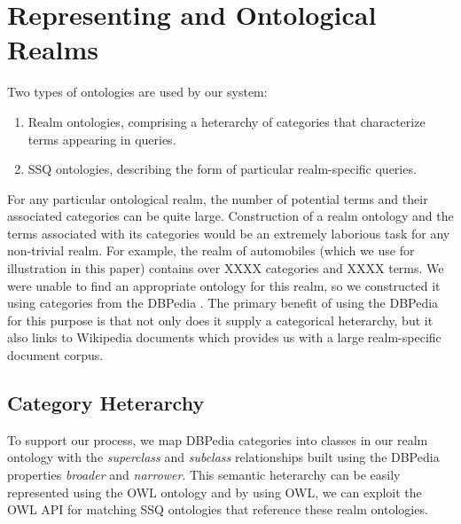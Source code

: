 \section{Representing and Ontological Realms}
Two types of ontologies are used by our system:
\begin{enumerate}
\item Realm ontologies, comprising a heterarchy of categories that
  characterize terms appearing in queries.
\item SSQ ontologies, describing the form of particular
  realm-specific queries.
\end{enumerate}
For any particular ontological realm, the number of potential
terms and their associated categories can be quite large.
Construction of a realm ontology and the terms associated
with its categories would be an extremely laborious task
for any non-trivial realm. For example, the realm of automobiles (which
we use for illustration in this paper) contains 
over XXXX categories and XXXX terms. We were unable to find
an appropriate ontology for this realm, so we constructed it
using categories from the DBPedia \cite{Auer07dbpedia:a}.
The primary benefit of using the DBPedia for this purpose is
that not only does it supply a categorical heterarchy, but it
also links to Wikipedia documents which provides us with a large
realm-specific document corpus.

\subsection{Category Heterarchy} 

To support our process, we map DBPedia categories into classes in our
realm ontology with the \textit{superclass} and \textit{subclass}
relationships built using the DBPedia properties \textit{broader} and
\textit{narrower}. This semantic heterarchy can be easily represented
using the OWL ontology and by using OWL, we can exploit the OWL API
for matching SSQ ontologies that reference these realm ontologies.



